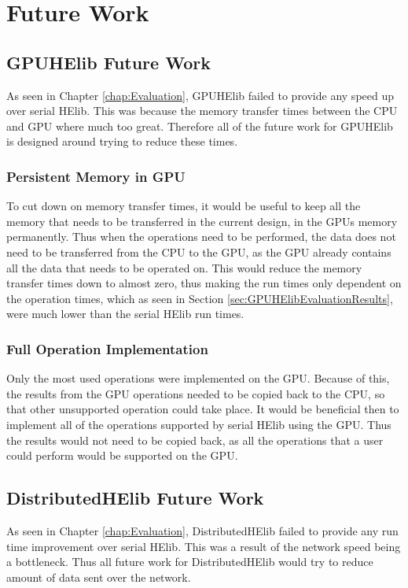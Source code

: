\chapter{Future Work} \label{chap:FutureWork}
\section{GPUHElib Future Work} \label{sec:GPUHElibFutureWork}
As seen in Chapter \ref{chap:Evaluation}, GPUHElib failed to provide any speed up over serial HElib. This was because the memory transfer times between the CPU and GPU where much too great. Therefore all of the future work for GPUHElib is designed around trying to reduce these times.

\subsection{Persistent Memory in GPU}
To cut down on memory transfer times, it would be useful to keep all the memory that needs to be transferred in the current design, in the GPUs memory permanently. Thus when the operations need to be performed, the data does not need to be transferred from the CPU to the GPU, as the GPU already contains all the data that needs to be operated on. This would reduce the memory transfer times down to almost zero, thus making the run times only dependent on the operation times, which as seen in Section \ref{sec:GPUHElibEvaluationResults}, were much lower than the serial HElib run times.

\subsection{Full Operation Implementation}
Only the most used operations were implemented on the GPU. Because of this, the results from the GPU operations needed to be copied back to the CPU, so that other unsupported operation could take place. It would be beneficial then to implement all of the operations supported by serial HElib using the GPU. Thus the results would not need to be copied back, as all the operations that a user could perform would be supported on the GPU.

\section{DistributedHElib Future Work} \label{sec:DistributedHElibFutureWork}
As seen in Chapter \ref{chap:Evaluation}, DistributedHElib failed to provide any run time improvement over serial HElib. This was a result of the network speed being a bottleneck. Thus all future work for DistributedHElib would try to reduce amount of data sent over the network.

